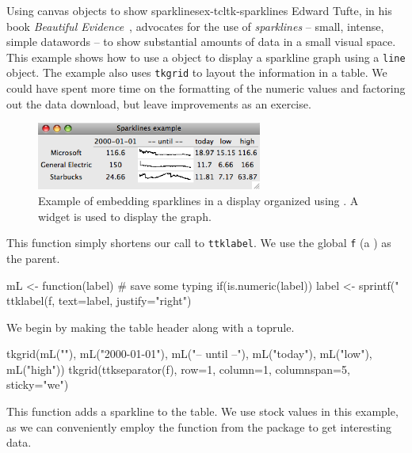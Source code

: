 \begin{example}{Using canvas objects to show sparklines}{ex-tcltk-sparklines}
Edward Tufte, in his book \textit{Beautiful
  Evidence}~\cite{Tufte:Beautiful-Evidence}, advocates for the use of
\textit{sparklines} -- small, intense, simple datawords -- to show substantial
amounts of data in a small visual space. This example shows how to use
a  object to display a sparkline graph using a \texttt{line} object. The example also uses \texttt{tkgrid}
to layout the information in a  table. We could have spent more time on the
formatting of the numeric values and factoring out the data download, but leave improvements as an exercise.


\begin{figure}
  \centering
  \includegraphics[width=0.66\textwidth]{fig-tcltk-sparklines.png}
  \caption{Example of embedding sparklines in a display organized
    using . A  widget is used to display
    the graph.}
  \label{fig:fig-tcltk-sparklines}
\end{figure}


This function simply shortens our call to \texttt{ttklabel}. We use the global \texttt{f} (a ) as the parent.
\begin{Schunk}
\begin{Sinput}
 mL <- function(label) { # save some typing
   if(is.numeric(label))
     label <- sprintf("%
   ttklabel(f, text=label, justify="right") 
 }
\end{Sinput}
\end{Schunk}
We begin by making the table header along with a toprule.
\begin{Schunk}
\begin{Sinput}
 tkgrid(mL(""), mL("2000-01-01"), mL("-- until --"), 
        mL("today"), mL("low"), mL("high"))
 tkgrid(ttkseparator(f), row=1, column=1, columnspan=5, sticky="we")
\end{Sinput}
\end{Schunk}

This function adds a sparkline to the table. We use stock values in
this example, as we can conveniently employ the
 function from the  package to
get interesting data.
\begin{Schunk}
\end{Schunk}
\end{example}
